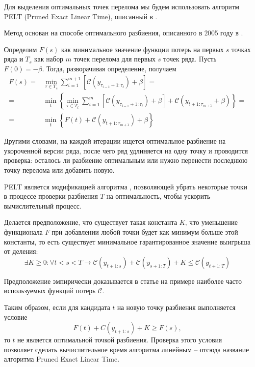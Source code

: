 \par
Для выделения оптимальных точек перелома мы будем использовать алгоритм PELT (Pruned Exact Linear Time), описанный в \cite{pelt}.
\par
Метод основан на способе оптимального разбиения, описанного в 2005 году в \cite{jackson}.
\par
Определим $F(s)$ как минимальное значение функции потерь на первых $s$ точках ряда и $T_s$ как набор $m$ точек перелома для первых $s$ точек ряда. Пусть $F(0) = -\beta$. Тогда, разворачивая определение, получаем
\begin{equation}
    \begin{split}
    F(s) =&\min_{\tau\in T_s}\sum_{i=1}^{m+1}\left[\mathcal{C}(y_{\tau_{i-1}+1:\tau_i})+\beta\right]=\\
    = &\min_{t} \left\{\min_{\tau\in T_t}\sum_{i=1}^{m}\left[\mathcal{C}(y_{\tau_{i-1}+1:\tau_i})+\beta\right]+\mathcal{C}(y_{t+1:\tau_{m+1}}+\beta)\right\} = \\
    = &\min_{t} \left\{ F(t)+\mathcal{C}(y_{t+1:\tau_{m+1}})+\beta\right\}
    \end{split}
\end{equation}

\par
Другими словами, на каждой итерации ищется оптимальное разбиение на укороченной версии ряда, после чего ряд удлиняется на одну точку и проводится проверка: осталось ли разбиение оптимальным или нужно перенести последнюю точку перелома или добавить  новую.
\par
PELT является модификацией алгоритма \cite{jackson}, позволяющей убрать некоторые точки в процессе проверки разбиения $T$ на оптимальность, чтобы ускорить вычислительный процесс. 
\par
Делается предположение, что существует такая константа $K$, что уменьшение функционала $F$ при добавлении любой точки будет как минимум больше этой константы, то есть существует минимальное гарантированное значение выигрыша от деления:
\begin{equation}
    \exists K \geq 0: \forall t < s < T \rightarrow
    \mathcal{C}(y_{t+1:s})+\mathcal{C}(y_{s+1:T})+K \leq \mathcal{C}(y_{t+1:T})
\end{equation}
\par
Предположение эмпирически доказывается в статье \cite{pelt} на примере наиболее часто используемых функций потерь $\mathcal{C}$.
\par
Таким образом, если для кандидата $t$ на новую точку разбиения выполняется условие
\begin{equation}
    F(t)+C\left(y_{t+1:s}\right)+K\geq F(s),
\end{equation}
то $t$ не является оптимальной точкой разбиения. Проверка этого условия позволяет сделать вычислительное время алгоритма линейным – отсюда название алгоритма Pruned Exact Linear Time.


